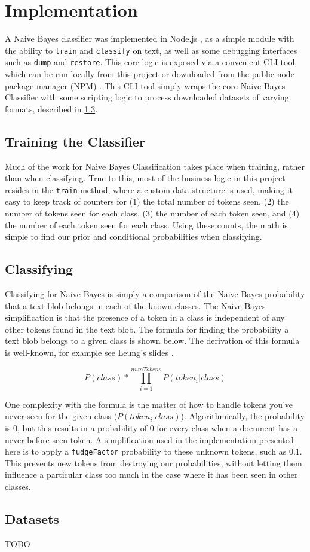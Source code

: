 \section{Implementation}
\label{section:implementation}
A Naive Bayes classifier was implemented in Node.js \cite{node}, as a simple module with the ability to \texttt{train}
and \texttt{classify} on text, as well as some debugging interfaces such as \texttt{dump} and \texttt{restore}. This
core logic is exposed via a convenient CLI tool, which can be run locally from this project or downloaded from the
public node package manager (NPM) \cite{rdn-naive-bayes}. This CLI tool simply wraps the core Naive Bayes Classifier
with some scripting logic to process downloaded datasets of varying formats, described in \ref{subsection:datasets}.

\subsection{Training the Classifier}
\label{subsection:training}
Much of the work for Naive Bayes Classification takes place when training, rather than when classifying. True to this,
most of the business logic in this project resides in the \texttt{train} method, where a custom data structure is used,
making it easy to keep track of counters for (1) the total number of tokens seen, (2) the number of tokens seen for each
class, (3) the number of each token seen, and (4) the number of each token seen for each class. Using these counts,
the math is simple to find our prior and conditional probabilities when classifying.

\subsection{Classifying}
\label{subsection:classifying}
Classifying for Naive Bayes is simply a comparison of the Naive Bayes probability that a text blob belongs in each of
the known classes. The Naive Bayes simplification is that the presence of a token in a class is independent of any
other tokens found in the text blob. The formula for finding the probability a text blob belongs to a given class is
shown below. The derivation of this formula is well-known, for example see Leung's slides \cite{naive-bayes-slides}.

\begin{equation}
P(class)*\prod_{i=1}^{numTokens} P(token_i | class)
\end{equation}

One complexity with the formula is the matter of how to handle tokens you've never seen for the given
class (\begin{math}P(token_i | class)\end{math}). Algorithmically, the probability is 0, but this results in a
probability of 0 for every class when a document has a never-before-seen token. A simplification used in the
implementation presented here is to apply a \texttt{fudgeFactor} probability to these unknown tokens, such as 0.1.
This prevents new tokens from destroying our probabilities, without letting them influence a particular class too much
in the case where it has been seen in other classes.

\subsection{Datasets}
\label{subsection:datasets}
TODO
